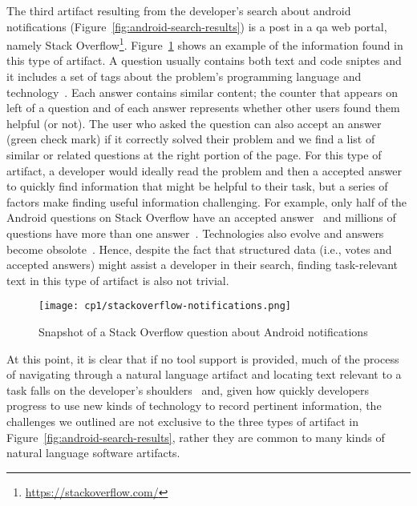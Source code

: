 The third artifact resulting from the developer's search 
about android notifications (Figure~\ref{fig:android-search-results})
is a post in a \acf{qa} web portal, namely Stack Overflow\footnote{\url{https://stackoverflow.com/}}.
Figure~\ref{fig:qa-notification-icon} shows an example of the information found in this type of artifact.
A question usually contains both text and code sniptes
and it includes a set of tags  about the
problem's programming language and technology~\cite{Treude2011a}. 
Each answer contains similar content; 
the counter that appears on left of a question and of each answer
represents whether other users found them helpful (or not).
The user who asked the question can also accept an answer (green check mark)
if it correctly solved their problem
and we find a list of similar or related questions 
at the right portion of the page. 
For this type of artifact, a developer would ideally read the problem and 
then a accepted answer to quickly find information that might be helpful 
to their task, but a series of factors make finding useful information challenging. 
For example, only half of the Android questions on Stack Overflow
have an accepted answer~\cite{parnin2012} 
and millions of questions have more than one answer~\cite{nadi2020}.
Technologies also evolve and answers become obsolote~\cite{Allamanis2013}.
Hence, despite the fact that structured data (i.e., votes and accepted answers) might 
assist a developer
in their search, finding task-relevant text in this type of artifact is also not 
trivial.




\begin{figure}
    \centering
    \texttt{[image: cp1/stackoverflow-notifications.png]}
    \caption{Snapshot of a Stack Overflow question about Android notifications}
    \label{fig:qa-notification-icon}
\end{figure}



At this point, it is clear that if no tool support is provided, much of the process of navigating through a natural language artifact and  locating text 
relevant to a task falls on the developer's shoulders~\cite{gonccalves2011, Ko2006a, Bystrom1995} and, given how quickly developers progress to use new kinds of technology to
record pertinent information, the challenges we outlined are not exclusive 
to the three types of artifact in Figure~\ref{fig:android-search-results}, rather 
they are common to many kinds of natural language software artifacts.




